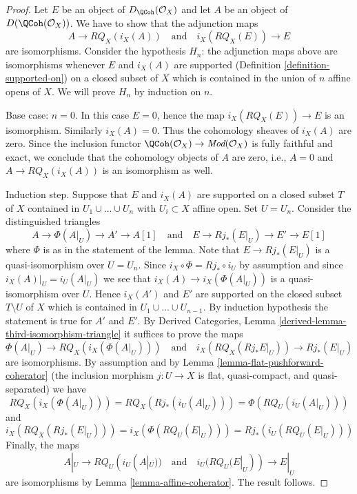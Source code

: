 \begin{proof}
Let $E$ be an object of $D_\QCoh(\mathcal{O}_X)$ and
let $A$ be an object of $D(\QCoh(\mathcal{O}_X))$.
We have to show that the adjunction maps
$$
A \to RQ_X(i_X(A))
\quad\text{and}\quad
i_X(RQ_X(E)) \to E
$$
are isomorphisms. Consider the hypothesis
$H_n$: the adjunction maps above are isomorphisms
whenever $E$ and $i_X(A)$ are supported
(Definition \ref{definition-supported-on})
on a closed subset of $X$ which
is contained in the union of $n$ affine opens of $X$.
We will prove $H_n$ by induction on $n$.

\medskip\noindent
Base case: $n = 0$. In this case $E = 0$, hence the map
$i_X(RQ_X(E)) \to E$ is an isomorphism. Similarly $i_X(A) = 0$.
Thus the cohomology sheaves of $i_X(A)$ are zero. Since the inclusion
functor $\QCoh(\mathcal{O}_X) \to \textit{Mod}(\mathcal{O}_X)$
is fully faithful and exact, we conclude that the cohomology
objects of $A$ are zero, i.e., $A = 0$ and
$A \to RQ_X(i_X(A))$ is an isomorphism as well.

\medskip\noindent
Induction step. Suppose that $E$ and $i_X(A)$ are supported on a
closed subset $T$ of $X$ contained in $U_1 \cup \ldots \cup U_n$
with $U_i \subset X$ affine open. Set $U = U_n$.
Consider the distinguished triangles
$$
A \to \Phi(A|_U) \to A' \to A[1]
\quad\text{and}\quad
E \to Rj_*(E|_U) \to E' \to E[1]
$$
where $\Phi$ is as in the statement of the lemma.
Note that $E \to Rj_*(E|_U)$ is a quasi-isomorphism over $U = U_n$.
Since $i_X \circ \Phi = Rj_* \circ i_U$ by assumption
and since $i_X(A)|_U = i_U(A|_U)$
we see that $i_X(A) \to i_X(\Phi(A|_U))$ is a quasi-isomorphism over $U$.
Hence $i_X(A')$ and $E'$ are supported on the closed
subset $T \setminus U$ of $X$ which is contained in
$U_1 \cup \ldots \cup U_{n - 1}$.
By induction hypothesis the statement is true for $A'$ and $E'$. By
Derived Categories, Lemma \ref{derived-lemma-third-isomorphism-triangle}
it suffices to prove the maps
$$
\Phi(A|_U) \to RQ_X(i_X(\Phi(A|_U)))
\quad\text{and}\quad
i_X(RQ_X(Rj_*E|_U)) \to Rj_*(E|_U)
$$
are isomorphisms. By assumption and by
Lemma \ref{lemma-flat-pushforward-coherator}
(the inclusion morphism $j : U \to X$ is flat, quasi-compact, and
quasi-separated) we have
$$
RQ_X(i_X(\Phi(A|_U))) = RQ_X(Rj_*(i_U(A|_U))) = \Phi(RQ_U(i_U(A|_U)))
$$
and
$$
i_X(RQ_X(Rj_*(E|_U))) = i_X(\Phi(RQ_U(E|_U))) = Rj_*(i_U(RQ_U(E|_U)))
$$
Finally, the maps
$$
A|_U \to RQ_U(i_U(A|_U))
\quad\text{and}\quad
i_U(RQ_U(E|_U)) \to E|_U
$$
are isomorphisms by Lemma \ref{lemma-affine-coherator}. The result follows.
\end{proof}

